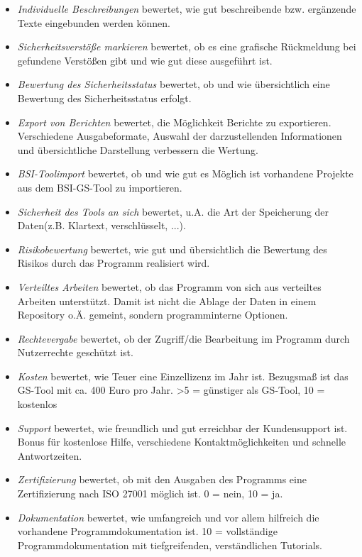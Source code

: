 \begin{itemize}
	\item \textit{Individuelle Beschreibungen} bewertet, wie gut beschreibende bzw. ergänzende Texte eingebunden werden können.

	\item \textit{Sicherheitsverstöße markieren} bewertet, ob es eine grafische Rückmeldung bei gefundene Verstößen gibt und wie gut diese ausgeführt ist.
	\item \textit{Bewertung des Sicherheitsstatus} bewertet, ob und wie übersichtlich eine Bewertung des Sicherheitsstatus erfolgt.
	\item \textit{Export von Berichten} bewertet, die Möglichkeit Berichte zu exportieren. Verschiedene Ausgabeformate, Auswahl der darzustellenden Informationen und übersichtliche Darstellung verbessern die Wertung.
	\item \textit{BSI-Toolimport} bewertet, ob und wie gut es Möglich ist vorhandene Projekte aus dem BSI-GS-Tool zu importieren.
	\item \textit{Sicherheit des Tools an sich} bewertet, u.A. die Art der Speicherung der Daten(z.B. Klartext, verschlüsselt, ...).
	\item \textit{Risikobewertung} bewertet, wie gut und übersichtlich die Bewertung des Risikos durch das Programm realisiert wird. 
	\item \textit{Verteiltes Arbeiten} bewertet, ob das Programm von sich aus verteiltes Arbeiten unterstützt. Damit ist nicht die Ablage der Daten in einem Repository o.Ä. gemeint, sondern programminterne Optionen.
	\item \textit{Rechtevergabe} bewertet, ob der Zugriff/die Bearbeitung im Programm durch Nutzerrechte geschützt ist. 
	\item \textit{Kosten} bewertet, wie Teuer eine Einzellizenz im Jahr ist. Bezugsmaß ist das GS-Tool mit ca. 400 Euro pro Jahr. >5 = günstiger als GS-Tool, 10 = kostenlos 
	\item \textit{Support} bewertet, wie freundlich und gut erreichbar der Kundensupport ist. Bonus für kostenlose Hilfe, verschiedene Kontaktmöglichkeiten und schnelle Antwortzeiten.
	\item \textit{Zertifizierung} bewertet, ob mit den Ausgaben des Programms eine Zertifizierung nach ISO 27001 möglich ist. 0 = nein, 10 = ja.
	\item \textit{Dokumentation} bewertet, wie umfangreich und vor allem hilfreich die vorhandene Programmdokumentation ist. 10 = vollständige Programmdokumentation mit tiefgreifenden, verständlichen Tutorials.

\end{itemize}
